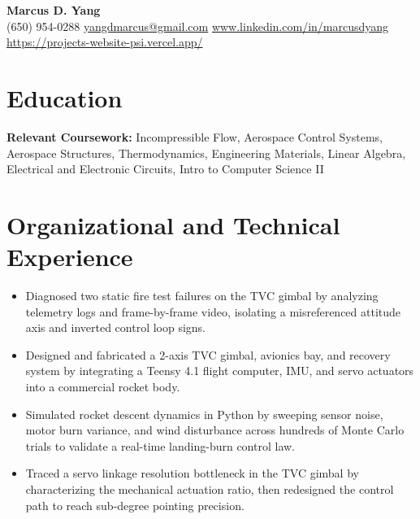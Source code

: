 \newcommand{\entrygap}{\vspace{2pt}}



\begin{center}
  {\fontsize{17}{20}\selectfont\bfseries Marcus D. Yang}\\[2pt]
  {\footnotesize (650) 954-0288 \textbar{} \href{mailto:yangdmarcus@gmail.com}{yangdmarcus@gmail.com} \textbar{} \href{https://www.linkedin.com/in/marcusdyang}{www.linkedin.com/in/marcusdyang} \textbar{} \href{https://projects-website-psi.vercel.app/}{https://projects-website-psi.vercel.app/}}
\end{center}

\section{Education}
\textbf{Relevant Coursework:} Incompressible Flow, Aerospace Control Systems, Aerospace Structures, Thermodynamics, Engineering Materials, Linear Algebra, Electrical and Electronic Circuits, Intro to Computer Science II

\section{Organizational and Technical Experience}

\begin{itemize}
  \item Diagnosed two static fire test failures on the TVC gimbal by analyzing telemetry logs and frame-by-frame video, isolating a misreferenced attitude axis and inverted control loop signs.
  \item Designed and fabricated a 2-axis TVC gimbal, avionics bay, and recovery system by integrating a Teensy 4.1 flight computer, IMU, and servo actuators into a commercial rocket body.
  \item Simulated rocket descent dynamics in Python by sweeping sensor noise, motor burn variance, and wind disturbance across hundreds of Monte Carlo trials to validate a real-time landing-burn control law.
  \item Traced a servo linkage resolution bottleneck in the TVC gimbal by characterizing the mechanical actuation ratio, then redesigned the control path to reach sub-degree pointing precision.
\end{itemize}
\entrygap

